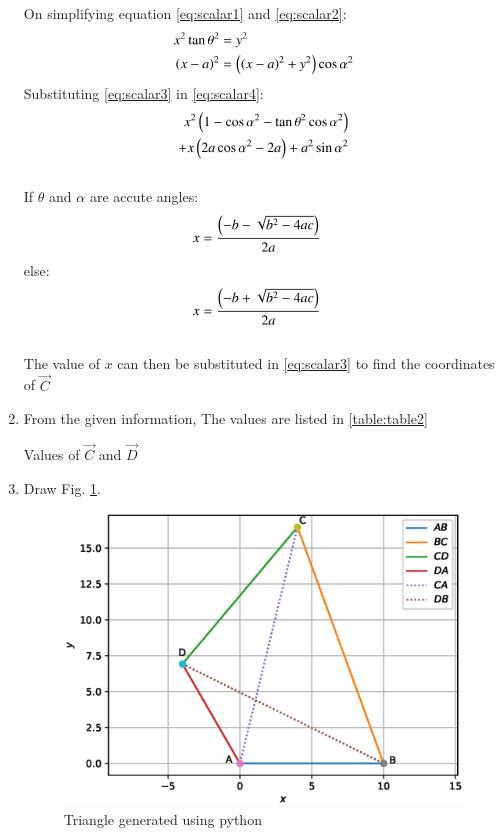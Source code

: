 \begin{enumerate}[label=\thesection.\arabic*.,ref=\thesection.\theenumi]
On simplifying equation \ref{eq:scalar1} and \ref{eq:scalar2}:
\begin{align}
x^2 \tan{\theta}^2 &= y^2 \label{eq:scalar3}\\
\left(x - a\right)^2 &= \left(\left(x-a\right)^2 + y^2\right)\cos{\alpha}^2\label{eq:scalar4}
\end{align}
Substituting \ref{eq:scalar3} in \ref{eq:scalar4}:
\begin{align}
\begin{split}\label{eq:scalar5}
x^2\left(1-\cos{\alpha}^2-\tan{\theta}^2\cos{\alpha}^2\right)\\
+ x\left(2a\cos{\alpha}^2-2a\right) + a^2\sin{\alpha}^2
\end{split}
\end{align}\\

If $\theta$ and $\alpha$ are accute angles:
\begin{align}
x &= \frac{\left(-b-\sqrt{b^2-4ac}\right)}{2a}
\end{align}
else:
\begin{align}
x &= \frac{\left(-b+\sqrt{b^2-4ac}\right)}{2a}
\end{align}\\

The value of $x$ can then be substituted in \ref{eq:scalar3} to find the coordinates of $\vec{C}$\\ 

\item
From the given information, 
The values are listed in \ref{table:table2}\\
\begin{table}[ht!]
\centering

\caption{Values of $\vec{C}$ and $\vec{D}$}
\label{table:table2}	
\end{table} 

\item Draw Fig. \ref{fig:cyclic_quad2}.

\begin{figure}[!ht]
\centering
\includegraphics[width=\columnwidth]{./figs/cyclic_quad.eps}
\caption{Triangle generated using python}
\label{fig:cyclic_quad2}
\end{figure} 


\end{enumerate}
